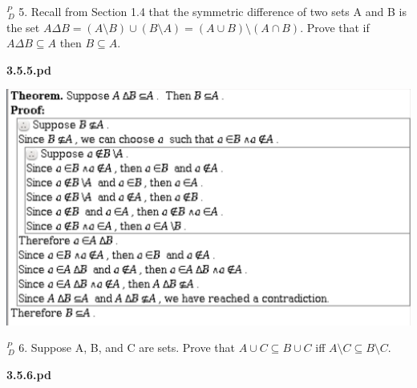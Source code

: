 \documentclass{article}
\begin{document}
\vspace{30pt}

$^{\textit{P}}_{\, \textit{D}}$ 5. Recall from Section 1.4 that the symmetric difference of two sets A and B
is the set $A \Delta B = (A \setminus B) \cup (B \setminus A) = (A \cup B) \setminus (A \cap B)$. Prove that
if $A \Delta B \subseteq A$ then $B \subseteq A$.

\vspace{30pt}

\textbf{3.5.5.pd}
\vspace{10pt}

\includegraphics[width=\textwidth]{3_5_5}

\vspace{30pt}

$^{\textit{P}}_{\, \textit{D}}$ 6. Suppose A, B, and C are sets. Prove that $A \cup C \subseteq B \cup C$ iff $A \setminus C \subseteq B \setminus C$.

\vspace{30pt}

\textbf{3.5.6.pd}
\vspace{10pt}
\end{document}
